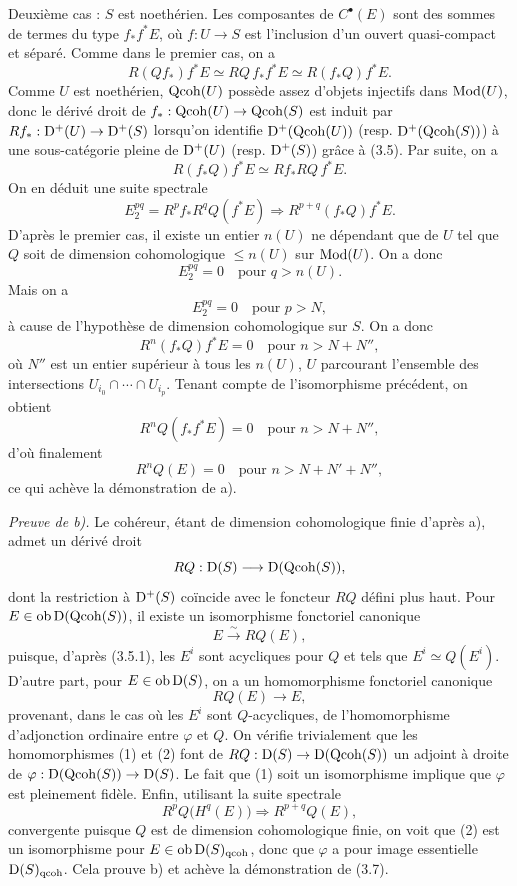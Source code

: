 \documentclass[11pt]{article}
\begin{document}
Deuxième cas : $S$ est noethérien. Les composantes de $C^\bullet(E)$ sont des sommes de termes du type $f_*f^*E$, où $f:U\to S$ est l'inclusion d'un ouvert quasi-compact et séparé. Comme dans le premier cas, on a
\[
R(Qf_*)f^*E\simeq RQ\,f_*f^*E\simeq R(f_*Q)f^*E.
\]
Comme $U$ est noethérien, $\operatorname{Qcoh}(U)$ possède assez d'objets injectifs dans $\operatorname{Mod}(U)$, donc le dérivé droit de $f_*:\operatorname{Qcoh}(U)\to\operatorname{Qcoh}(S)$ est induit par $Rf_*:\mathrm D^+(U)\to\mathrm D^+(S)$ lorsqu'on identifie $\mathrm D^+(\operatorname{Qcoh}(U))$ (resp. $\mathrm D^+(\operatorname{Qcoh}(S))$) à une sous-catégorie pleine de $\mathrm D^+(U)$ (resp. $\mathrm D^+(S)$) grâce à (3.5). Par suite, on a
\[
R(f_*Q)f^*E\simeq Rf_*RQ\,f^*E.
\]
On en déduit une suite spectrale
\[
E_2^{pq}=R^pf_*R^qQ(f^*E)\Longrightarrow R^{p+q}(f_*Q)f^*E.
\]
D'après le premier cas, il existe un entier $n(U)$ ne dépendant que de $U$ tel que $Q$ soit de dimension cohomologique $\leq n(U)$ sur $\operatorname{Mod}(U)$. On a donc
\[
E_2^{pq}=0\quad\text{pour }q>n(U).
\]
Mais on a
\[
E_2^{pq}=0\quad\text{pour }p>N,
\]
à cause de l'hypothèse de dimension cohomologique sur $S$. On a donc
\[
R^n(f_*Q)f^*E=0\quad\text{pour }n>N+N'',
\]
où $N''$ est un entier supérieur à tous les $n(U)$, $U$ parcourant l'ensemble des intersections $U_{i_0}\cap\cdots\cap U_{i_p}$. Tenant compte de l'isomorphisme précédent, on obtient
\[
R^nQ(f_*f^*E)=0\quad\text{pour }n>N+N'',
\]
d'où finalement
\[
R^nQ(E)=0\quad\text{pour }n>N+N'+N'',
\]
ce qui achève la démonstration de a).

\emph{Preuve de b).} Le cohéreur, étant de dimension cohomologique finie d'après a), admet un dérivé droit
\[
RQ:\mathrm D(S)\longrightarrow\mathrm D(\operatorname{Qcoh}(S)),
\]
dont la restriction à $\mathrm D^+(S)$ coïncide avec le foncteur $RQ$ défini plus haut. Pour $E\in\operatorname{ob}\mathrm D(\operatorname{Qcoh}(S))$, il existe un isomorphisme fonctoriel canonique
\begin{equation}\tag{1}
E\xrightarrow{\sim} RQ(E),
\end{equation}
puisque, d'après (3.5.1), les $E^i$ sont acycliques pour $Q$ et tels que $E^i\simeq Q(E^i)$. D'autre part, pour $E\in\operatorname{ob}\mathrm D(S)$, on a un homomorphisme fonctoriel canonique
\begin{equation}\tag{2}
RQ(E)\longrightarrow E,
\end{equation}
provenant, dans le cas où les $E^i$ sont $Q$-acycliques, de l'homomorphisme d'adjonction ordinaire entre $\varphi$ et $Q$. On vérifie trivialement que les homomorphismes (1) et (2) font de $RQ:\mathrm D(S)\to\mathrm D(\operatorname{Qcoh}(S))$ un adjoint à droite de $\varphi:\mathrm D(\operatorname{Qcoh}(S))\to\mathrm D(S)$. Le fait que (1) soit un isomorphisme implique que $\varphi$ est pleinement fidèle. Enfin, utilisant la suite spectrale
\[
R^pQ\bigl(H^q(E)\bigr)\Longrightarrow R^{p+q}Q(E),
\]
convergente puisque $Q$ est de dimension cohomologique finie, on voit que (2) est un isomorphisme pour $E\in\operatorname{ob}\mathrm D(S)_{\operatorname{qcoh}}$, donc que $\varphi$ a pour image essentielle $\mathrm D(S)_{\operatorname{qcoh}}$. Cela prouve b) et achève la démonstration de (3.7).
\end{document}
